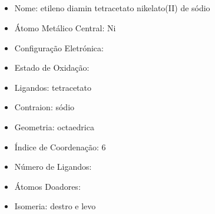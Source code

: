 \documentclass[12pt]{article}
\begin{document}
\noindent\begin{minipage}{\textwidth}
	
	\subsection{\ch{}}
	\begin{itemize}
   \item Nome:
   	etileno diamin tetracetato nikelato(II) de sódio
   
   \item Átomo Metálico Central:
   	Ni
   	
   \item Configuração Eletrónica:
   
   
   \item Estado de Oxidação:
   	
   
   \item Ligandos:
   	tetracetato
   
   \item Contraion:
   	sódio
   
   \item Geometria:
   	octaedrica
   
   \item Índice de Coordenação: 
   	6
   
   \item Número de Ligandos:
   
   
   \item Átomos Doadores:
   
   
   \item Isomeria:
   	destro e levo
	
	
	\end{itemize}
	
\end{minipage}
\end{document}
